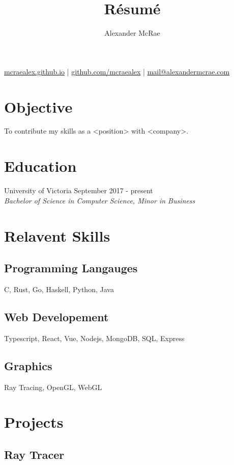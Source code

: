 \documentclass{article}
\makeatletter
\renewcommand{\maketitle}{
\begin{center}
{\huge \bfseries \theauthor}

\vspace{0.25em}
\url{mcraealex.github.io} | \url{github.com/mcraealex} | \href{mailto:mail@alexandermcrae.com}{mail@alexandermcrae.com}
\end{center}}
\newcommand{\hrefColored}[3]{\href{#2}{\color{#1}{#3}}}
\makeatother
\begin{document}
\title{R\'esum\'e}
\author{Alexander McRae}

\maketitle

\section{Objective}

\noindent To contribute my skills as a <position> with <company>.

\section{Education}

\noindent University of Victoria \hfill September 2017 - present\\
\textit{Bachelor of Science in Computer Science, Minor in Business}

\section{Relavent Skills}

\subsection{Programming Langauges}

C, Rust, Go, Haskell, Python, Java

\subsection{Web Developement}

Typescript, React, Vue, Nodejs, MongoDB, SQL, Express

\subsection{Graphics}

Ray Tracing, OpenGL, WebGL

\section{Projects}

\subsection{Ray Tracer \hrefColored{blue}{https://github.com/McRaeAlex/tiny-raytracer}{github.com/McRaeAlex/tiny-raytracer}}
\end{document}
